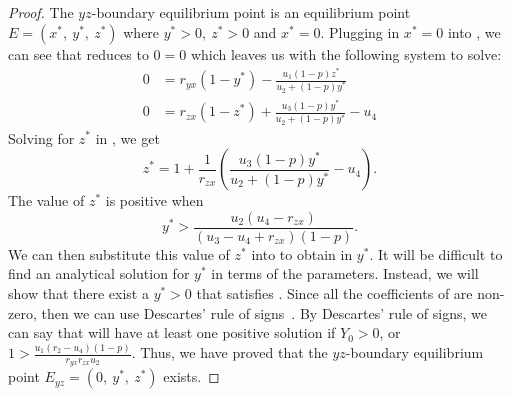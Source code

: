 \begin{proof}
    The $yz$-boundary equilibrium point is an equilibrium point $E=\left(x^*,\ y^*,\ z^*\right)$ where $y^*>0,\ z^*>0$ and $x^*=0$.
    Plugging in $x^*=0$ into , we can see that  reduces to $0=0$ which leaves us with the following system to solve:
    \begin{subequations}\label{system:yz-boundary}
        \begin{align}
            0 &= r_{yx}\left(1-y^*\right)-\frac{u_1\left(1-p\right)z^*}{u_2+\left(1-p\right)y^*} \label{eq:yz-boundary-y}\\
            0 &= r_{zx}\left(1-z^*\right)+\frac{u_3\left(1-p\right)y^*}{u_2+\left(1-p\right)y^*}-u_4 \label{eq:yz-boundary-z}
        \end{align}
    \end{subequations}
    Solving for $z^*$ in , we get
    \begin{equation*}
        z^*=1+\frac{1}{r_{zx}}\left(\frac{u_3\left(1-p\right)y^*}{u_2+\left(1-p\right)y^*}-u_4\right).
    \end{equation*}
    The value of $z^*$ is positive when
    \begin{equation*}
        y^* > \frac{u_2\left(u_4-r_{zx}\right)}{\left(u_3-u_4+r_{zx}\right)\left(1-p\right)}.
    \end{equation*}
    We can then substitute this value of $z^*$ into  to obtain  in $y^*$.
    It will be difficult to find an analytical solution for $y^*$ in terms of the parameters.
    Instead, we will show that there exist a $y^*>0$ that satisfies .
    Since all the coefficients of  are non-zero, then we can use Descartes' rule of signs~\cite{WANG2004525526}.
    By Descartes' rule of signs, we can say that  will have at least one positive solution if $Y_0>0$, or $1 > \frac{u_1\left(r_2-u_4\right)\left(1-p\right)}{r_{yx}r_{zx}u_2}$.
    Thus, we have proved that the $yz$-boundary equilibrium point $E_{yz}=\left(0,\ y^*,\ z^*\right)$ exists.
\end{proof}
